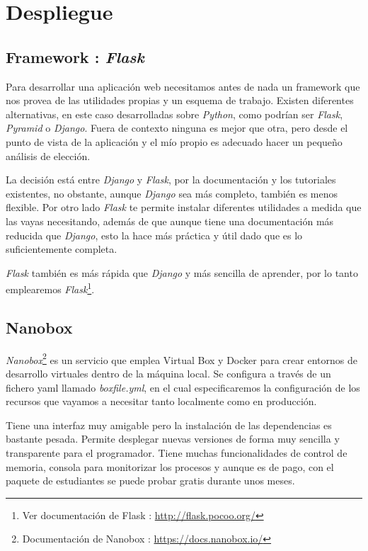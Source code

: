 \section{Despliegue}
\subsection{Framework : \textit{Flask}}
Para desarrollar una aplicación web necesitamos antes de nada un framework que nos provea de las utilidades propias y un esquema de trabajo. Existen diferentes alternativas, en este caso desarrolladas sobre \textit{Python}, como podrían ser \textit{Flask}, \textit{Pyramid} o \textit{Django}. Fuera de contexto ninguna es mejor que otra, pero desde el punto de vista de la aplicación y el mío propio es adecuado hacer un pequeño análisis de elección.

La decisión está entre\textit{ Django} y \textit{Flask}, por la documentación y los tutoriales existentes, no obstante, aunque \textit{Django} sea más completo, también es menos flexible. Por otro lado \textit{Flask} te permite instalar diferentes utilidades a medida que las vayas necesitando, además de que aunque tiene una documentación más reducida que \textit{Django}, esto la hace más práctica y útil dado que es lo suficientemente completa.

 \textit{Flask} también es más rápida que \textit{Django} y más sencilla de aprender, por lo tanto emplearemos \textit{Flask}\footnote{Ver documentación de Flask : \url{http://flask.pocoo.org/}}.



\subsection{Nanobox}
\textit{Nanobox}\footnote{Documentación de Nanobox : \url{https://docs.nanobox.io/}} es un servicio que emplea Virtual Box y Docker para crear entornos de desarrollo virtuales dentro de la máquina local. Se configura a través de un fichero yaml llamado \textit{boxfile.yml}, en el cual especificaremos la configuración de los recursos que vayamos a necesitar tanto localmente como en producción. 

Tiene una interfaz muy amigable pero la instalación de las dependencias es bastante pesada. Permite desplegar nuevas versiones de forma muy sencilla y transparente para el programador. Tiene muchas funcionalidades de control de memoria, consola para monitorizar los procesos y aunque es de pago, con el paquete de estudiantes se puede probar gratis durante unos meses.

